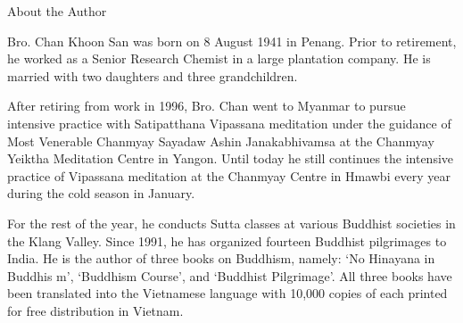 About the Author

Bro. Chan Khoon San was born on 8 August 1941 in Penang. Prior to retirement, he worked as a Senior Research Chemist in a large plantation company. He is married with two daughters and three grandchildren.

After retiring from work in 1996, Bro. Chan went to Myanmar to pursue intensive practice with Satipatthana Vipassana meditation under the guidance of Most Venerable Chanmyay Sayadaw Ashin Janakabhivamsa  at the Chanmyay Yeiktha Meditation Centre in Yangon. Until today he still continues the intensive practice of Vipassana meditation at the Chanmyay Centre in Hmawbi every year during the cold season in January.

For the rest of the year, he conducts Sutta classes at various Buddhist societies in the Klang Valley. Since 1991, he has organized fourteen Buddhist pilgrimages to India. He is the author of three books on Buddhism, namely: ‘No Hinayana in Buddhis m’, ‘Buddhism Course’, and ‘Buddhist Pilgrimage’. All three books have been translated into the Vietnamese language with 10,000 copies of each printed for free distribution in Vietnam.
